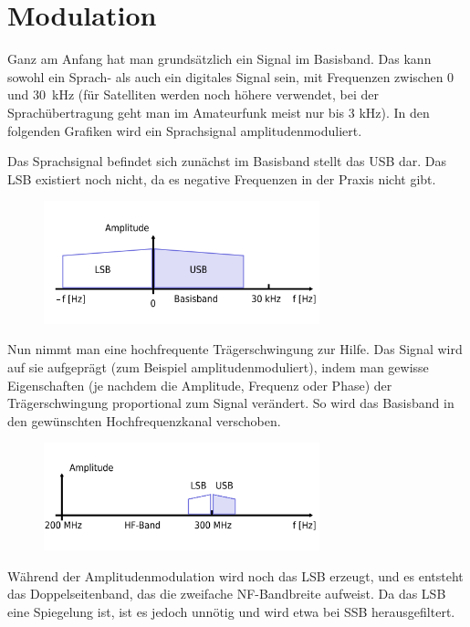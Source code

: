 \chapter{Modulation}
Ganz am Anfang hat man grundsätzlich ein Signal im Basisband. Das kann sowohl ein Sprach- als auch ein digitales Signal sein, mit Frequenzen zwischen 0 und 30 kHz (für Satelliten werden noch höhere verwendet, bei der Sprachübertragung geht man im Amateurfunk meist nur bis 3 kHz). In den folgenden Grafiken wird ein Sprachsignal amplitudenmoduliert.

Das Sprachsignal befindet sich zunächst im Basisband stellt das USB dar. Das LSB existiert noch nicht, da es negative Frequenzen in der Praxis nicht gibt.

\begin{figure}[h!]
 \centering
 \includegraphics[width=8cm]{./png/Amfu-Modulation-Basisband.png}
 \label{fig:basisband}
\end{figure}


Nun nimmt man eine hochfrequente Trägerschwingung zur Hilfe. Das Signal wird auf sie aufgeprägt (zum Beispiel amplitudenmoduliert), indem man gewisse Eigenschaften (je nachdem die Amplitude, Frequenz oder Phase) der Trägerschwingung proportional zum Signal verändert. So wird das Basisband in den gewünschten Hochfrequenzkanal verschoben.

\begin{figure}[h!]
 \centering
 \includegraphics[width=8cm]{./png/Amfu-Modulation-HF.png}
 \label{fig:hfband}
\end{figure}


Während der Amplitudenmodulation wird noch das LSB erzeugt, und es entsteht das Doppelseitenband, das die zweifache NF-Bandbreite aufweist. Da das LSB eine Spiegelung ist, ist es jedoch unnötig und wird etwa bei SSB herausgefiltert.

